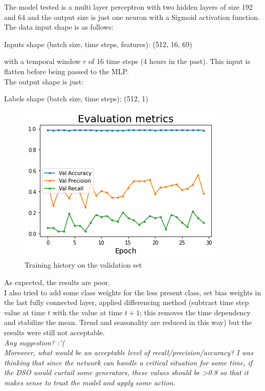 The model tested is a multi layer perceptron with two hidden layers of size 192 and 64 and the output size is just one neuron with a Sigmoid activation function.\\
The data input shape is as follows:

\begin{algorithm}[h]
    \State Inputs shape (batch size, time steps, features): (512, 16, 69)
\end{algorithm}

\noindent with a temporal window $r$ of 16 time steps (4 hours in the past). This input is flatten before being passed to the MLP. \\
The output shape is just:
\begin{algorithm}[h]
    \State Labels shape (batch size, time steps): (512, 1)
\end{algorithm}

\begin{figure}[H]
\centering
    \includegraphics[width=.6\linewidth]{images/MVOberr/DenseNNResult.png}
\caption{Training history on the validation set}
 \end{figure}
\noindent As expected, the results are poor. \\
I also tried to add some class weights for the less present class, set bias weights in the last fully connected layer, applied differencing method (subtract time step value at time $t$ with the value at time $t+1$; this removes the time dependency and stabilize the mean. Trend and seasonality are reduced in this way) but the results were still not acceptable.\\

\noindent \emph{Any suggestion? :'( \\ Moreover, what would be an acceptable level of recall/precision/accuracy? I was thinking that since the network can handle a critical situation for some time, if the DSO would curtail some generators, these values should be >0.8 so that it makes sense to trust the model and apply some action.} \label{q:evaluation}

